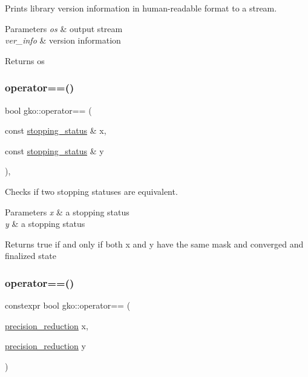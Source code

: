 Prints library version information in human-\/readable format to a stream. 


\begin{DoxyParams}{Parameters}
{\em os} & output stream \\
\hline
{\em ver\+\_\+info} & version information\\
\hline
\end{DoxyParams}
\begin{DoxyReturn}{Returns}
os 
\end{DoxyReturn}
\mbox{\label{namespacegko_acf34f605deac3e475189bb5b8a0fa71a}} 
\subsubsection{\texorpdfstring{operator==()}{operator==()}\hspace{0.1cm}{\footnotesize\ttfamily [1/2]}}
{\footnotesize\ttfamily bool gko\+::operator== (\begin{DoxyParamCaption}\item[{const \hyperlink{classgko_1_1stopping__status}{stopping\+\_\+status} \&}]{x,  }\item[{const \hyperlink{classgko_1_1stopping__status}{stopping\+\_\+status} \&}]{y }\end{DoxyParamCaption})\hspace{0.3cm}{\ttfamily [inline]}, {\ttfamily [noexcept]}}



Checks if two stopping statuses are equivalent. 


\begin{DoxyParams}{Parameters}
{\em x} & a stopping status \\
\hline
{\em y} & a stopping status\\
\hline
\end{DoxyParams}
\begin{DoxyReturn}{Returns}
true if and only if both {\ttfamily x} and {\ttfamily y} have the same mask and converged and finalized state 
\end{DoxyReturn}
\mbox{\label{namespacegko_a4dbafa6e062c2036991ec8c3f6b201cf}} 
\subsubsection{\texorpdfstring{operator==()}{operator==()}\hspace{0.1cm}{\footnotesize\ttfamily [2/2]}}
{\footnotesize\ttfamily constexpr bool gko\+::operator== (\begin{DoxyParamCaption}\item[{\hyperlink{classgko_1_1precision__reduction}{precision\+\_\+reduction}}]{x,  }\item[{\hyperlink{classgko_1_1precision__reduction}{precision\+\_\+reduction}}]{y }\end{DoxyParamCaption})\hspace{0.3cm}{\ttfamily [noexcept]}}



